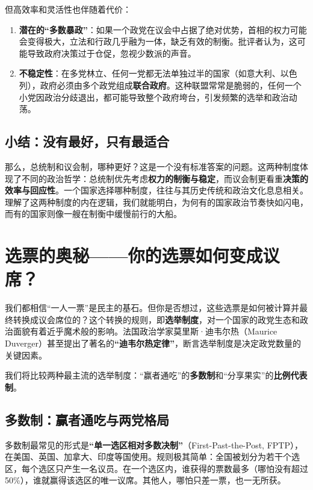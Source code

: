 \documentclass[a5paper, 11pt, openany]{ctexbook}
\begin{document}
但高效率和灵活性也伴随着代价：
\begin{enumerate}
    \item \textbf{潜在的“多数暴政”}：如果一个政党在议会中占据了绝对优势，首相的权力可能会变得极大，立法和行政几乎融为一体，缺乏有效的制衡。批评者认为，这可能导致政府决策过于仓促，忽视少数派的声音。
    \item \textbf{不稳定性}：在多党林立、任何一党都无法单独过半的国家（如意大利、以色列），政府必须由多个政党组成\textbf{联合政府}。这种联盟常常是脆弱的，任何一个小党因政治分歧退出，都可能导致整个政府垮台，引发频繁的选举和政治动荡。
\end{enumerate}

\subsection{小结：没有最好，只有最适合}

那么，总统制和议会制，哪种更好？这是一个没有标准答案的问题。这两种制度体现了不同的政治哲学：总统制优先考虑\textbf{权力的制衡与稳定}，而议会制更看重\textbf{决策的效率与回应性}。一个国家选择哪种制度，往往与其历史传统和政治文化息息相关。理解了这两种制度的内在逻辑，我们就能明白，为何有的国家政治节奏快如闪电，而有的国家则像一艘在制衡中缓慢前行的大船。

\section{选票的奥秘——你的选票如何变成议席？}

我们都相信“一人一票”是民主的基石。但你是否想过，这些选票是如何被计算并最终转换成议会席位的？这个转换的规则，即\textbf{选举制度}，对一个国家的政党生态和政治面貌有着近乎魔术般的影响。法国政治学家莫里斯·迪韦尔热（Maurice Duverger）甚至提出了著名的\textbf{“迪韦尔热定律”}，断言选举制度是决定政党数量的关键因素。

我们将比较两种最主流的选举制度：“赢者通吃”的\textbf{多数制}和“分享果实”的\textbf{比例代表制}。

\subsection{多数制：赢者通吃与两党格局}

多数制最常见的形式是\textbf{“单一选区相对多数决制”}（First-Past-the-Post, FPTP），在美国、英国、加拿大、印度等国使用。规则极其简单：全国被划分为若干个选区，每个选区只产生一名议员。在一个选区内，谁获得的票数最多（哪怕没有超过50\%），谁就赢得该选区的唯一议席。其他人，哪怕只差一票，也一无所获。
\end{document}
